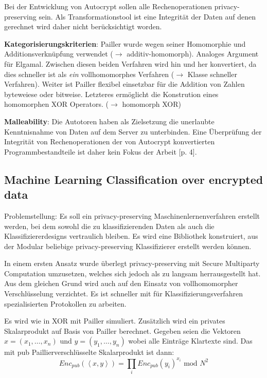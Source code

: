 \documentclass[12pt,a4paper]{scrartcl}				%
\begin{document}
Bei der Entwicklung von Autocrypt sollen alle Rechenoperationen privacy-preserving sein. Als Transformationstool ist eine Integrität der Daten auf denen gerechnet wird daher nicht berücksichtigt worden.

\textbf{Kategorisierungskriterien}: Pailler wurde wegen seiner Homomorphie und Additionsverknüpfung verwendet ($\rightarrow$ additiv-homomorph). Analoges Argument für Elgamal. Zwischen diesen beiden Verfahren wird hin und her konvertiert, da dies schneller ist als \textit{ein} vollhomomorphes Verfahren ($\rightarrow$ Klasse schneller Verfahren). Weiter ist Pailler flexibel einsetzbar für die Addition von Zahlen byteweiese oder bitweise. Letzteres ermöglicht die Konstrution eines homomorphen XOR Operators. ($\rightarrow$ homomorph XOR)

\textbf{Malleability}: Die Autotoren haben als Zielsetzung die unerlaubte Kenntnisnahme von Daten auf dem Server zu unterbinden. Eine Überprüfung der Integrität von Rechenoperationen der von Autocrypt konvertierten Programmbestandteile ist daher kein Fokus der Arbeit [p. 4].

\subsection*{Machine Learning Classification over encrypted data} \cite{bost2015machine}
Problemstellung: Es soll ein privacy-preserving Maschinenlernenverfahren erstellt werden, bei dem sowohl die zu klassifizierenden Daten als auch die Klassifiziererdesigns vertraulich bleiben. Es wird eine Bibliothek konstruiert, aus der Modular beliebige privacy-preserving Klassifizierer erstellt werden können.

In einem ersten Ansatz wurde überlegt privacy-preserving mit Secure Multiparty Computation umzusetzen, welches sich jedoch als zu langsam herrausgestellt hat. Aus dem gleichen Grund wird auch auf den Einsatz von vollhomomorpher Verschlüsselung verzichtet. Es ist schneller mit für Klassifizierungsverfahren spezialisierten Protokollen zu arbeiten. 

Es wird wie in \cite{tople2013autocrypt} XOR mit Pailler simuliert. Zusätzlich wird ein privates Skalarprodukt auf Basis von Pailler berechnet.
Gegeben seien die Vektoren $x=(x_1,\ldots,x_n)$ und $y=(y_1,\ldots,y_n)$  wobei alle Einträge Klartexte sind. Das mit pub Paillierverschlüsselte Skalarprodukt ist dann:
\begin{equation}
	Enc_{pub}(\left\langle x,y\right\rangle )=\prod_i Enc_{pub}(y_i)^{x_i} \text{ mod } N^2
\end{equation}
\end{document}
